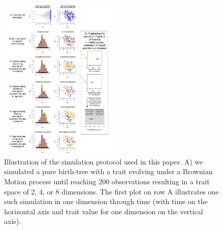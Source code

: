\documentclass[12pt,letterpaper]{article}
\providecommand{\DIFaddbeginFL}{} %
\providecommand{\DIFaddendFL}{} %
\providecommand{\DIFdelbeginFL}{} %
\providecommand{\DIFdelendFL}{} %
\newcommand{\DIFscaledelfig}{0.5}
\newlength{\DIFdelgraphicswidth} %
\newlength{\DIFdelgraphicsheight} %
\newcommand{\DIFaddincludegraphics}[2][]{{\color{blue}\fbox{\DIFOincludegraphics[#1]{#2}}}} %
\newcommand{\DIFdelincludegraphics}[2][]{%
\sbox{\DIFdelgraphicsbox}{\DIFOincludegraphics[#1]{#2}}%
\settoboxwidth{\DIFdelgraphicswidth}{\DIFdelgraphicsbox} %
\settoboxtotalheight{\DIFdelgraphicsheight}{\DIFdelgraphicsbox} %
\scalebox{\DIFscaledelfig}{%
\parbox[b]{\DIFdelgraphicswidth}{\usebox{\DIFdelgraphicsbox}\\[-\baselineskip] \rule{\DIFdelgraphicswidth}{0em}}\llap{\resizebox{\DIFdelgraphicswidth}{\DIFdelgraphicsheight}{%
\setlength{\unitlength}{\DIFdelgraphicswidth}%
\begin{picture}(1,1)%
\thicklines\linethickness{2pt} %
{\color[rgb]{1,0,0}\put(0,0){\framebox(1,1){}}}%
{\color[rgb]{1,0,0}\put(0,0){\line( 1,1){1}}}%
{\color[rgb]{1,0,0}\put(0,1){\line(1,-1){1}}}%
\end{picture}%
}\hspace*{3pt}}} %
} %
\DeclareRobustCommand{\DIFaddbeginFL}{\DIFOaddbeginFL \let\includegraphics\DIFaddincludegraphics} %
\DeclareRobustCommand{\DIFaddendFL}{\DIFOaddendFL \let\includegraphics\DIFOincludegraphics} %
\DeclareRobustCommand{\DIFdelbeginFL}{\DIFOdelbeginFL \let\includegraphics\DIFdelincludegraphics} %
\DeclareRobustCommand{\DIFdelendFL}{\DIFOaddendFL \let\includegraphics\DIFOincludegraphics} %
\begin{document}
\begin{figure}[!htbp]
\centering
   \DIFdelbeginFL %
\DIFdelendFL \DIFaddbeginFL \includegraphics[width=0.5\textwidth]{Figures/simulation_protocol_explained.pdf}
\DIFaddendFL \caption{\DIFdelbeginFL %
\DIFdelendFL \DIFaddbeginFL \scriptsize{Illustration of the simulation protocol used in this paper.
A) we simulated a pure birth-tree with a trait evolving under a Brownian Motion process until reaching 200 observations resulting in a trait space of 2, 4, or 8 dimensions.
The first plot on row A illustrates one such simulation in one dimension through time (with time on the horizontal axis and trait value for one dimension on the vertical axis).
}}
\end{figure}
\end{document}
